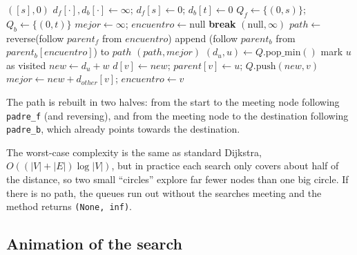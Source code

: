 \documentclass[11pt,letterpaper]{article}
\newcommand{\code}[1]{\texttt{#1}}
\begin{document}
\begin{algorithm}[H]
\caption{Bidirectional Dijkstra (\code{dijkstra\_bidireccional})}
\begin{algorithmic}[1]
   \Return $([s], 0)$ \EndIf
  \State $d_f[\cdot], d_b[\cdot] \gets \infty$; \quad $d_f[s] \gets 0$; \quad $d_b[t] \gets 0$
  \State $Q_f \gets \{(0, s)\}$; \quad $Q_b \gets \{(0, t)\}$
  \State $mejor \gets \infty$; \quad $encuentro \gets \text{null}$
     \textbf{break} \EndIf
      \State {}
    \Else
      \State {}
    \EndIf
  \EndWhile
   \Return $(\text{null}, \infty)$ \EndIf
  \State $path \gets$ reverse(follow $parent_f$ from $encuentro$)
  \State append (follow $parent_b$ from $parent_b[encuentro]$) to $path$
  \State \Return $(path, mejor)$
\EndProcedure
\Statex
{}
  \State $(d_u, u) \gets Q.\text{pop\_min}()$
   \Return \EndIf
  \State mark $u$ as visited
    \State $new \gets d_u + w$
      \State $d[v] \gets new$; \quad $parent[v] \gets u$; \quad $Q.\text{push}(new, v)$
    \EndIf
      \State $mejor \gets new + d_{other}[v]$; \quad $encuentro \gets v$
    \EndIf
  \EndFor
\EndProcedure
\end{algorithmic}
\end{algorithm}

The path is rebuilt in two halves: from the start to the meeting node
following \code{padre\_f} (and reversing), and from the meeting node to the
destination following \code{padre\_b}, which already points towards the
destination.

The worst-case complexity is the same as standard Dijkstra,
$O((|V|+|E|)\log|V|)$, but in practice each search only covers about half of
the distance, so two small ``circles'' explore far fewer nodes than one big
circle. If there is no path, the queues run out without the searches meeting
and the method returns \code{(None, inf)}.

\subsection{Animation of the search}
\end{document}
